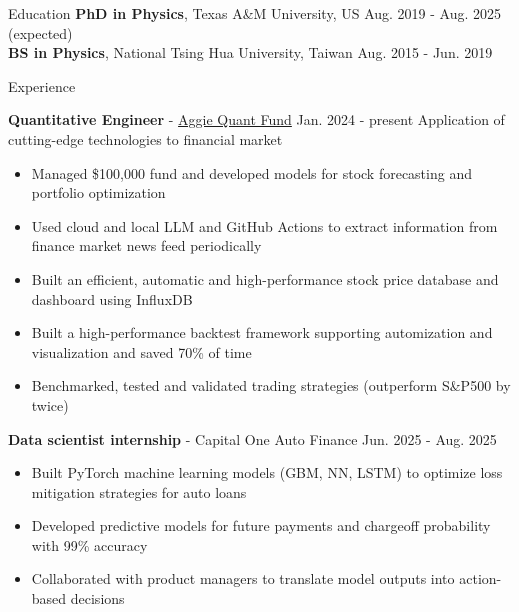 \documentclass{resume}
\begin{document}
\vspace{-1.5em}
\begin{rSection}{Education}
\vspace{-0.25em}
{\bf PhD in Physics}, Texas A\&M University, US \hfill {Aug. 2019 - Aug. 2025 (expected)} \\
{\bf BS in Physics}, National Tsing Hua University, Taiwan \hfill {Aug. 2015 - Jun. 2019}
\end{rSection}


\begin{rSection}{Experience}
    \vspace{-1.5em}
    \item \textbf{Quantitative Engineer} - \href{https://www.linkedin.com/company/aggieqf}{Aggie Quant Fund} \hfill Jan. 2024 - present
        \newline\hspace*{0.5em} {\normalsize Application of cutting-edge technologies to financial market}
        \begin{itemize}
        \item Managed \$100,000 fund and developed models for stock forecasting and portfolio optimization
        \item Used cloud and local LLM and GitHub Actions to extract information from finance market news feed periodically
        \item Built an efficient, automatic and high-performance stock price database and dashboard using InfluxDB
        \item Built a high-performance backtest framework supporting automization and visualization and saved 70\% of time
        \item Benchmarked, tested and validated trading strategies (outperform S\&P500 by twice)
        \end{itemize}

    \vspace{1em}
    \item \textbf{Data scientist internship} - Capital One Auto Finance \hfill Jun. 2025 - Aug. 2025
        \begin{itemize}
        \item Built PyTorch machine learning models (GBM, NN, LSTM) to optimize loss mitigation strategies for auto loans
        \item Developed predictive models for future payments and chargeoff probability with 99\% accuracy
        \item Collaborated with product managers to translate model outputs into action-based decisions
        \end{itemize}


\end{rSection}
\end{document}
